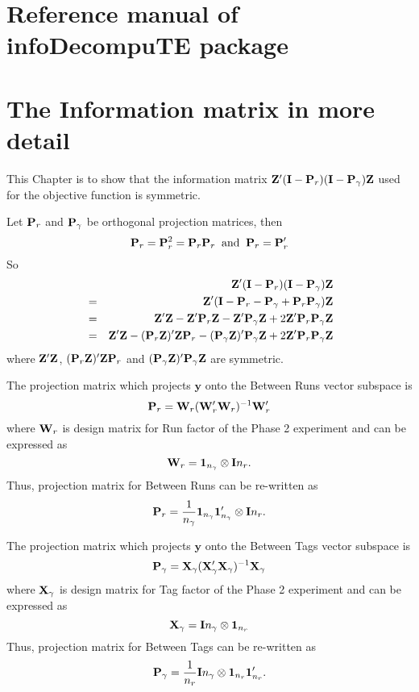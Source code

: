 \chapter{Reference manual of infoDecompuTE package} \label{append:infoDecompuTE}



\chapter{The Information matrix in more detail} \label{append:informatSym}
This Chapter is to show that the information matrix $\mathbf{Z}' (\mathbf{I}-\mathbf{P}_{r})(\mathbf{I} -\mathbf{P}_{\gamma}) \mathbf{Z}$ used for the objective function is symmetric. 

Let $\mathbf{P}_r$ and $\mathbf{P}_\gamma$ be orthogonal projection matrices, then 
\[
\mathbf{P}_r = \mathbf{P}_r^2 = \mathbf{P}_r\mathbf{P}_r \; \; \mathrm{and} \; \; \mathbf{P}_r = \mathbf{P}_r'
\]
So 
\begin{eqnarray}
\nonumber &&	\mathbf{Z}' (\mathbf{I}-\mathbf{P}_{r})(\mathbf{I} -\mathbf{P}_{\gamma}) \mathbf{Z}\\
\nonumber &=& 	\mathbf{Z}' (\mathbf{I}-\mathbf{P}_{r} - \mathbf{P}_{\gamma} + \mathbf{P}_{r}\mathbf{P}_{\gamma}) \mathbf{Z}\\
\nonumber &=&	\mathbf{Z}' \mathbf{Z} - \mathbf{Z}'\mathbf{P}_{r} \mathbf{Z}  - \mathbf{Z}' \mathbf{P}_{\gamma}\mathbf{Z}  + 2\mathbf{Z}' \mathbf{P}_{r}\mathbf{P}_{\gamma}\mathbf{Z}\\
\label{eq:informatSym} &=&	\mathbf{Z}' \mathbf{Z} - (\mathbf{P}_{r}\mathbf{Z})'\mathbf{Z}\mathbf{P}_{r} - (\mathbf{P}_{\gamma}\mathbf{Z} )'\mathbf{P}_{\gamma}\mathbf{Z}  + 2\mathbf{Z}' \mathbf{P}_{r}\mathbf{P}_{\gamma}\mathbf{Z}\\
\end{eqnarray}
where $\mathbf{Z}' \mathbf{Z}$, $(\mathbf{P}_{r}\mathbf{Z})'\mathbf{Z}\mathbf{P}_{r}$ and $(\mathbf{P}_{\gamma}\mathbf{Z} )'\mathbf{P}_{\gamma}\mathbf{Z}$ are symmetric. 

The projection matrix which projects $\bm{y}$ onto the Between Runs vector subspace is 
\[
\mathbf{P}_{r} = \mathbf{W}_{r}(\mathbf{W}_{r}'\mathbf{W}_{r})^{-1} \mathbf{W}_{r}'
\]
where $\mathbf{W}_{r}$ is design matrix for Run factor of the Phase 2 experiment and can be expressed as 
\[
 \mathbf{W}_{r} = \mathbf{1}_{n_\gamma} \otimes \mathbf{I}{n_r}.
\]
Thus, projection matrix for Between Runs can be re-written as  
\[
\mathbf{P}_{r} =\frac{1}{n_\gamma} \mathbf{1}_{n_\gamma}  \mathbf{1}_{n_\gamma}' \otimes \mathbf{I}{n_r}.
\]

The projection matrix which projects $\bm{y}$ onto the Between Tags vector subspace is 
\[
\mathbf{P}_{\gamma} = \mathbf{X}_{\gamma}(\mathbf{X}_{\gamma}'\mathbf{X}_{\gamma})^{-1}\mathbf{X}_{\gamma}
\]
where $\mathbf{X}_{\gamma}$ is design matrix for Tag factor of the Phase 2 experiment and can be expressed as 
\[
\mathbf{X}_{\gamma} = \mathbf{I}{n_\gamma} \otimes \mathbf{1}_{n_r} 
\]
Thus, projection matrix for Between Tags can be re-written as  
\[
\mathbf{P}_{\gamma} = \frac{1}{n_r} \mathbf{I}{n_\gamma} \otimes \mathbf{1}_{n_r}\mathbf{1}_{n_r}'.
\]

